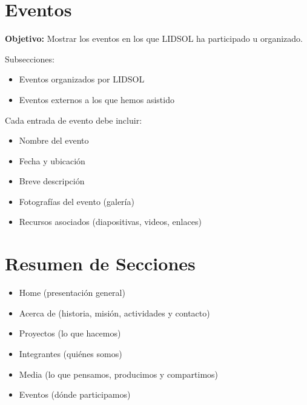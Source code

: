 \documentclass[12pt]{article}
\begin{document}
\section{Eventos}
\textbf{Objetivo:} Mostrar los eventos en los que LIDSOL ha participado u organizado.

Subsecciones:
\begin{itemize}
    \item Eventos organizados por LIDSOL
    \item Eventos externos a los que hemos asistido
\end{itemize}

Cada entrada de evento debe incluir:
\begin{itemize}[label=--]
    \item Nombre del evento
    \item Fecha y ubicación
    \item Breve descripción
    \item Fotografías del evento (galería)
    \item Recursos asociados (diapositivas, videos, enlaces)
\end{itemize}

\section*{Resumen de Secciones}
\begin{itemize}[label=--]
    \item Home (presentación general)
    \item Acerca de (historia, misión, actividades y contacto)
    \item Proyectos (lo que hacemos)
    \item Integrantes (quiénes somos)
    \item Media (lo que pensamos, producimos y compartimos)
    \item Eventos (dónde participamos)
\end{itemize}
\end{document}
